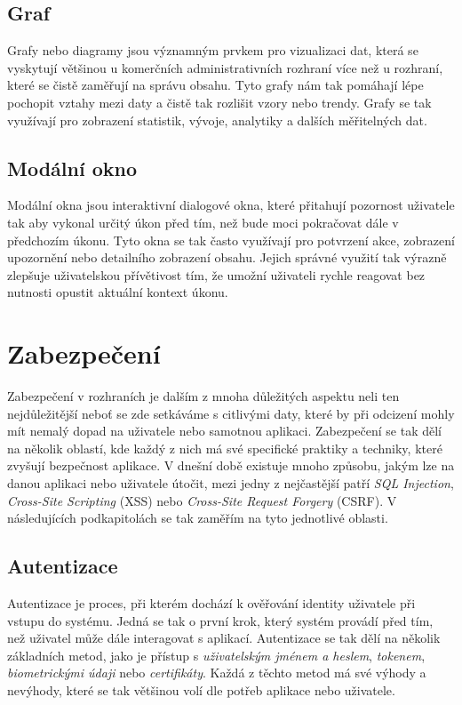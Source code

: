 \subsection*{Graf}
\label{subsec:admin-tags-chart}
Grafy nebo diagramy jsou významným prvkem pro vizualizaci dat, která se vyskytují většinou u komerčních administrativních rozhraní více než u rozhraní, které se čistě zaměřují na správu obsahu. Tyto grafy nám tak pomáhají lépe pochopit vztahy mezi daty a čistě tak rozlišit vzory nebo trendy. Grafy se tak využívají pro zobrazení statistik, vývoje, analytiky a dalších měřitelných dat.

\subsection*{Modální okno}
\label{subsec:admin-tags-modal}
Modální okna jsou interaktivní dialogové okna, které přitahují pozornost uživatele tak aby vykonal určitý úkon před tím, než bude moci pokračovat dále v předchozím úkonu. Tyto okna se tak často využívají pro potvrzení akce, zobrazení upozornění nebo detailního zobrazení obsahu. Jejich správné využití tak výrazně zlepšuje uživatelskou přívětivost tím, že umožní uživateli rychle reagovat bez nutnosti opustit aktuální kontext úkonu.

\section{Zabezpečení}
\label{sec:security}
Zabezpečení v rozhraních je dalším z mnoha důležitých aspektu neli ten nejdůležitější neboť se zde setkáváme s citlivými daty, které by při odcizení mohly mít nemalý dopad na uživatele nebo samotnou aplikaci. Zabezpečení se tak dělí na několik oblastí, kde každý z nich má své specifické praktiky a techniky, které zvyšují bezpečnost aplikace. V dnešní době existuje mnoho způsobu, jakým lze na danou aplikaci nebo uživatele útočit, mezi jedny z nejčastější patří \textit{SQL Injection}, \textit{Cross-Site Scripting} (XSS) nebo \textit{Cross-Site Request Forgery} (CSRF). V následujících podkapitolách se tak zaměřím na tyto jednotlivé oblasti.

\subsection{Autentizace}
\label{subsec:security-authentication}
Autentizace je proces, při kterém dochází k ověřování identity uživatele při vstupu do systému. Jedná se tak o první krok, který systém provádí před tím, než uživatel může dále interagovat s aplikací. Autentizace se tak dělí na několik základních metod, jako je přístup s \textit{uživatelským jménem a heslem}, \textit{tokenem}, \textit{biometrickými údaji} nebo \textit{certifikáty}. Každá z těchto metod má své výhody a nevýhody, které se tak většinou volí dle potřeb aplikace nebo uživatele.


